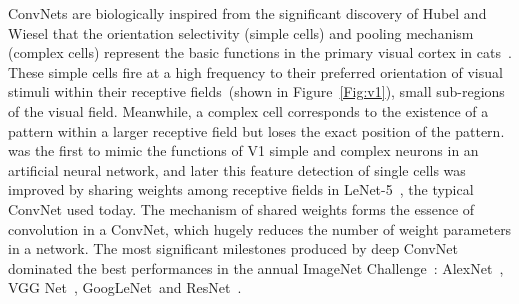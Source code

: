 ConvNets are biologically inspired from the significant discovery of Hubel and Wiesel that the orientation selectivity (simple cells) and pooling mechanism (complex cells) represent the basic functions in the primary visual cortex in cats~\DIFdelbegin {}\DIFdelend \DIFaddbegin {}\DIFaddend .
These simple cells fire at a high frequency to their preferred orientation of visual stimuli within their receptive fields~(shown in Figure~\ref{Fig:v1}), small sub-regions of the visual field.
Meanwhile, a complex cell corresponds to the existence of a pattern within a larger receptive field but loses the exact position of the pattern.
\DIFdelbegin {}\DIFdelend \DIFaddbegin {}\DIFaddend was the first \DIFaddbegin {}\DIFaddend to mimic the functions of V1 simple and complex neurons in an artificial neural network, and later this feature detection of single cells was improved by sharing weights among receptive fields in LeNet-5~\DIFdelbegin {}\DIFdelend \DIFaddbegin {}\DIFaddend , the typical ConvNet used today.
The mechanism of shared weights forms the essence of convolution in a ConvNet, which hugely reduces the number of weight parameters in a network.
The most significant milestones produced by deep ConvNet dominated the best performances in the annual ImageNet Challenge~\DIFdelbegin {}\DIFdelend \DIFaddbegin {}\DIFaddend : AlexNet~\DIFdelbegin {}\DIFdelend \DIFaddbegin {}\DIFaddend , VGG Net~\DIFdelbegin {}\DIFdelend \DIFaddbegin {}\DIFaddend , GoogLeNet~\DIFdelbegin {}\DIFdelend \DIFaddbegin {}\DIFaddend and ResNet~\DIFdelbegin {}\DIFdelend \DIFaddbegin {}\DIFaddend .

